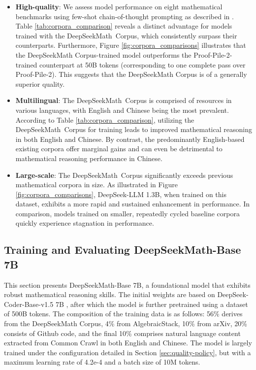 \begin{itemize}[topsep=0pt]
\begin{itemize}[topsep=0pt]
    \item \textbf{High-quality}: 
    We assess model performance on eight mathematical benchmarks using few-shot chain-of-thought prompting as described in \cite{cot}. Table \ref{tab:corpora_comparison} reveals a distinct advantage for models trained with the DeepSeekMath~Corpus, which consistently surpass their counterparts. Furthermore, Figure \ref{fig:corpora_comparisons} illustrates that the DeepSeekMath Corpus-trained model outperforms the Proof-Pile-2-trained counterpart at 50B tokens (corresponding to one complete pass over Proof-Pile-2). This suggests that the DeepSeekMath Corpus is of a generally superior quality.
    \item \textbf{Multilingual}: 
    The DeepSeekMath~Corpus is comprised of resources in various languages, with English and Chinese being the most prevalent. According to Table \ref{tab:corpora_comparison}, utilizing the DeepSeekMath~Corpus for training leads to improved mathematical reasoning in both English and Chinese. By contrast, the predominantly English-based existing corpora offer marginal gains and can even be detrimental to mathematical reasoning performance in Chinese.
    \item \textbf{Large-scale}:
    The DeepSeekMath~Corpus significantly exceeds previous mathematical corpora in size. As illustrated in Figure \ref{fig:corpora_comparisons}, DeepSeek-LLM 1.3B, when trained on this dataset, exhibits a more rapid and sustained enhancement in performance. In comparison, models trained on smaller, repeatedly cycled baseline corpora quickly experience stagnation in performance.
\end{itemize}

\subsection{Training and Evaluating DeepSeekMath-Base 7B}

This section presents DeepSeekMath-Base 7B, a foundational model that exhibits robust mathematical reasoning skills. The initial weights are based on DeepSeek-Coder-Base-v1.5 7B \citep{deepseek-coder}, after which the model is further pretrained using a dataset of 500B tokens. The composition of the training data is as follows: 56\% derives from the DeepSeekMath Corpus, 4\% from AlgebraicStack, 10\% from arXiv, 20\% consists of Github code, and the final 10\% comprises natural language content extracted from Common Crawl in both English and Chinese. The model is largely trained under the configuration detailed in Section \ref{sec:quality-policy}, but with a maximum learning rate of 4.2e-4 and a batch size of 10M tokens.


\end{itemize}
